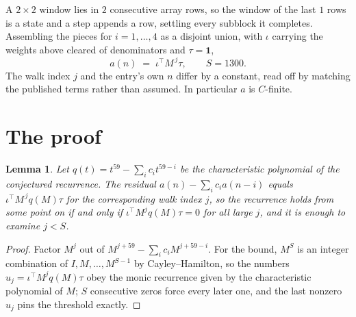\documentclass[11pt,a4paper]{article}
\theoremstyle{plain}
\newtheorem{lemma}[theorem]{Lemma}
\theoremstyle{definition}
\begin{document}
A $2\times2$ window lies in $2$ consecutive array rows, so the window of the last
$1$ rows is a state and a step appends a row, settling every subblock it completes.
Assembling the pieces for $i=1,\dots,4$ as a disjoint union, with $\iota$ carrying the
weights above cleared of denominators and $\tau=\mathbf{1}$,
\[
a(n)\;=\;\iota^{\!\top}M^{\,j}\tau ,\qquad S=1300.
\]
The walk index $j$ and the entry's own $n$ differ by a constant, read off by matching the
published terms rather than assumed. In particular $a$ is $C$-finite.

\section{The proof}

\begin{lemma}\label{lem:crit}
Let $q(t)=t^{59}-\sum_i c_it^{59-i}$ be the characteristic polynomial of the
conjectured recurrence. The residual $a(n)-\sum_ic_ia(n-i)$ equals
$\iota^{\!\top}M^{\,j}q(M)\tau$ for the corresponding walk index $j$, so the recurrence
holds from some point on if and only if $\iota^{\!\top}M^{j}q(M)\tau=0$ for all large $j$,
and it is enough to examine $j<S$.
\end{lemma}

\begin{proof}
Factor $M^{j}$ out of $M^{j+59}-\sum_ic_iM^{j+59-i}$. For the bound, $M^{S}$
is an integer combination of $I,M,\dots,M^{S-1}$ by Cayley--Hamilton, so the numbers
$u_j=\iota^{\!\top}M^{j}q(M)\tau$ obey the monic recurrence given by the characteristic
polynomial of $M$; $S$ consecutive zeros force every later one, and the last nonzero $u_j$
pins the threshold exactly.
\end{proof}
\end{document}
